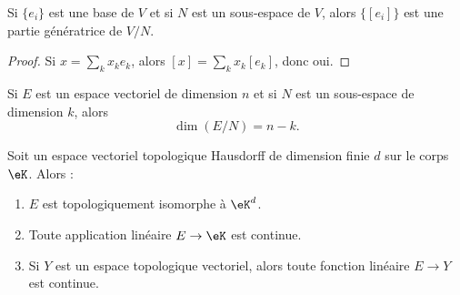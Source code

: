 \begin{proposition}
	Si \( \{ e_i \}\) est une base de \( V\) et si \( N\) est un sous-espace de \( V\), alors \( \{ [e_i] \}\) est une partie génératrice de \( V/N\).
\end{proposition}

\begin{proof}
	Si \( x=\sum_kx_ke_k\), alors \( [x]=\sum_kx_k[e_k]\), donc oui.
\end{proof}

\begin{proposition}	\label{PROPooDJLTooHZjSrA}
	Si \( E\) est un espace vectoriel de dimension \( n\) et si \( N\) est un sous-espace de dimension \( k\), alors
	\begin{equation}
		\dim(E/N)=n-k.
	\end{equation}
\end{proposition}



\begin{proposition}	\label{PROPooZWQWooBkdLfv}
	Soit un espace vectoriel topologique Hausdorff de dimension finie \( d\) sur le corps \( \eK\). Alors :
	\begin{enumerate}
		\item		\label{ITEMooVOTHooLiauZy}
		      \( E\) est topologiquement isomorphe à \( \eK^d\).
		\item		\label{ITEMooZEFFooUQOJuv}
		      Toute application linéaire \( E\to \eK\) est continue.
		\item		\label{ITEMooSEPKooZVfyoD}
		      Si \( Y\) est un espace topologique vectoriel, alors toute fonction linéaire \( E \to Y \) est continue.
	\end{enumerate}
\end{proposition}


